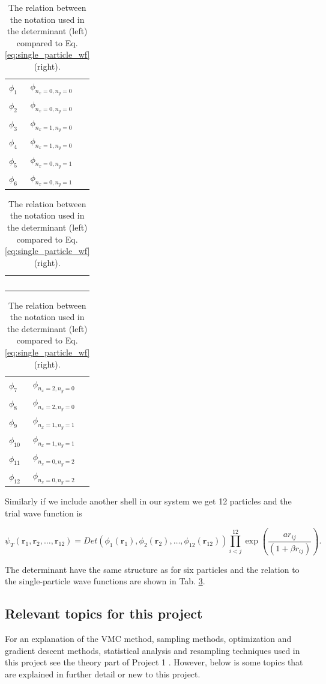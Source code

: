 \begin{table}[H]\caption{The relation between the notation used in the determinant (left) compared to Eq. \ref{eq:single_particle_wf} (right). }\label{tab:notation_wavefunctions}
\large
\center
\begin{tabular}{l|l} 
$\phi_{1}$ & $\phi_{n_x=0, n_y=0}$\\
$\phi_{2}$ & $\phi_{n_x=0, n_y=0}$\\
$\phi_{3}$ & $\phi_{n_x=1, n_y=0}$\\
$\phi_{4}$ & $\phi_{n_x=1, n_y=0}$\\
$\phi_{5}$ & $\phi_{n_x=0, n_y=1}$\\
$\phi_{6}$ & $\phi_{n_x=0, n_y=1}$\\
\end{tabular}
\begin{tabular}{c}
$\,$
\end{tabular}
\begin{tabular}{l|l} 
$\phi_{7}$ & $\phi_{n_x=2, n_y=0}$\\
$\phi_{8}$ & $\phi_{n_x=2, n_y=0}$\\
$\phi_{9}$ & $\phi_{n_x=1, n_y=1}$\\
$\phi_{10}$ & $\phi_{n_x=1, n_y=1}$\\
$\phi_{11}$ & $\phi_{n_x=0, n_y=2}$\\
$\phi_{12}$ & $\phi_{n_x=0, n_y=2}$\\
\end{tabular}
\end{table}

Similarly if we include another shell in our system we get 12 particles and the trial wave function is 

\begin{equation}
   \psi_{T}(\bm{r}_1,\bm{r}_2, \dots,\bm{r}_{12}) = 
   Det\left(\phi_{1}(\bm{r}_1),\phi_{2}(\bm{r}_2),
   \dots,\phi_{12}(\bm{r}_{12})\right)
   \prod_{i<j}^{12}\exp{\left(\frac{ar_{ij}}{(1+\beta r_{ij})}\right)}.
\end{equation}

The determinant have the same structure as for six particles and the relation to the single-particle wave functions are shown in Tab. \ref{tab:notation_wavefunctions}.

\subsection{Relevant topics for this project}

For an explanation of the VMC method, sampling methods, optimization and gradient descent methods, statistical analysis and resampling techniques used in this project see the theory part of Project 1 \cite{project1}. However, below is some topics that are explained in further detail or new to this project. 

